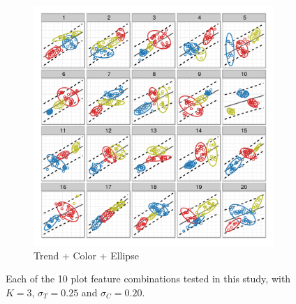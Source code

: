 \documentclass[11pt]{isuthesis}\usepackage[]{graphicx}\usepackage[]{color}
\begin{document}
\begin{figure}[ht]
\begin{subfigure}[t]{0.28\linewidth}
\end{subfigure}
\begin{subfigure}[t]{0.28\linewidth}
  \caption{Trend + Color + Ellipse}
  \includegraphics[width=\linewidth]{fig-samplepics-10}
\end{subfigure}
\caption[Sample lineup stimuli for each of the 10 aesthetic combinations]{Each of the 10 plot feature combinations tested in this study, with $K=3$, $\sigma_T=0.25$ and $\sigma_C=0.20$. \label{fig:plotExamples}}
\end{figure}
\end{document}
